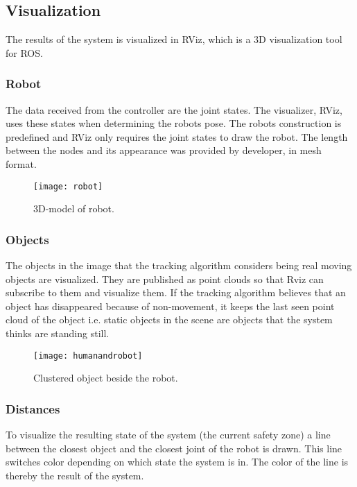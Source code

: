 \subsection{Visualization}

The results of the system is visualized in RViz, which is a 3D visualization tool for ROS. 

\subsubsection{Robot}
The data received from the controller are the joint states.
The visualizer, RViz, uses these states when determining the robots pose.
The robots construction is predefined and RViz only requires the joint states to draw the robot.
The length between the nodes and its appearance was provided by developer, in mesh format.
 
\begin{figure}[H]
\begin{center}
\texttt{[image: robot]}
\caption{3D-model of robot.}

\end{center}
\end{figure}

\subsubsection{Objects}
The objects in the image that the tracking algorithm considers being real moving objects are visualized. They are published as point clouds so that Rviz can subscribe to them and visualize them. If the tracking algorithm believes that an object has disappeared because of non-movement, it keeps the last seen point cloud of the object i.e. static objects in the scene are objects that the system thinks are standing still. 

\begin{figure}[H]
\begin{center}
\texttt{[image: humanandrobot]}
\caption{Clustered object beside the robot.}

\end{center}
\end{figure}


\subsubsection{Distances}
To visualize the resulting state of the system (the current safety zone) a line between the closest object and the closest joint of the robot is drawn. This line switches color depending on which state the system is in. The color of the line is thereby the result of the system. 

